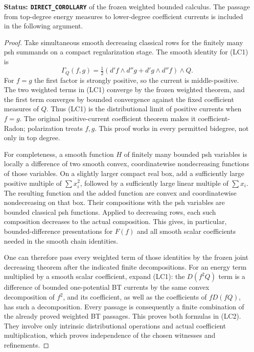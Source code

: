 \documentclass[11pt,a4paper]{article}
\numberwithin{equation}{section}
\theoremstyle{definition}
\theoremstyle{remark}
\begin{document}
\noindent\textbf{Status: \texttt{DIRECT\_COROLLARY}} of the
frozen weighted bounded calculus.  The passage from top-degree
energy measures to lower-degree coefficient currents is included
in the following argument.

\begin{proof}
Take simultaneous smooth decreasing classical rows for the finitely
many psh summands on a compact regularization stage.  The smooth
identity for (LC1) is
\[
 \Gamma_Q(f,g)
 =\tfrac12(d'f\wedge d''g+d'g\wedge d''f)\wedge Q.
\]
For $f=g$ the first factor is strongly positive, so the current is
middle-positive.  The two weighted terms in (LC1) converge by the
frozen weighted theorem, and the first term converges by bounded
convergence against the fixed coefficient measures of $Q$.
Thus (LC1) is the distributional limit of positive currents when
$f=g$.  The original positive-current coefficient theorem makes
it coefficient-Radon; polarization treats $f,g$.  This proof works
in every permitted bidegree, not only in top degree.

For completeness, a smooth function $H$ of finitely many bounded
psh variables is locally a difference of two smooth convex,
coordinatewise nondecreasing functions of those variables.  On a
slightly larger compact real box, add a sufficiently large positive
multiple of $\sum x_i^2$, followed by a sufficiently large linear
multiple of $\sum x_i$.  The resulting function and the added
function are convex and coordinatewise nondecreasing on that box.
Their compositions with the psh variables are bounded classical
psh functions.  Applied to decreasing rows, each such composition
decreases to the actual composition.  This gives, in particular,
bounded-difference presentations for $F(f)$ and all smooth scalar
coefficients needed in the smooth chain identities.

One can therefore pass every weighted term of those identities by
the frozen joint decreasing theorem after the indicated finite
decompositions.  For an energy term multiplied by a smooth scalar
coefficient, expand (LC1): the $D(f^2Q)$ term is a difference of
bounded one-potential BT currents by the same convex decomposition
of $f^2$, and its coefficient, as well as the coefficients of
$fD(fQ)$, has such a decomposition.  Every passage is consequently
a finite combination of the already proved weighted BT passages.
This proves both formulas in (LC2).  They involve only intrinsic
distributional operations and actual coefficient multiplication,
which proves independence of the chosen witnesses and refinements.
\end{proof}
\end{document}
